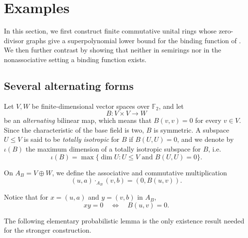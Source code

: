 \documentclass[a4paper,11pt]{amsart}
\theoremstyle{definition}
\newcommand{\F}{\mathbb F}
\begin{document}
\section{Examples}\label{sec:examples}

In this section, we first construct finite commutative unital rings whose zero-divisor graphs give a superpolynomial lower bound for the binding
function of .  We then further contrast  by showing that neither in semirings nor in the nonassociative setting a binding function exists.

\subsection{Several alternating forms}\label{subsec:many-forms}

Let $V,W$ be finite-dimensional vector spaces over $\F_2$, and let
\[
 B:V\times V\rightarrow W
\]
be an \textit{alternating} bilinear map, which means that $B(v,v)=0$ for every $v\in V$.  Since the characteristic of the base field is two, $B$ is
symmetric. A subspace $U\leq V$ is said to be \textit{totally isotropic} for $B$ if $B(U,U)=0$, and we denote by $\iota(B)$ the maximum dimension of a totally isotropic subspace for $B$, i.e. \[
 \iota(B)=\max\{\dim U:U\le V\text{ and } B(U,U)=0\}.
\]

On $A_B=V\oplus W$, we define the associative and commutative multiplication
\begin{equation}\label{eq:two-step-product}
 (u,a)\cdot_{A_B}(v,b)=(0,B(u,v)).
\end{equation}

Notice that for $x=(u,a)$ and $y=(v,b)$ in $A_B$,
\begin{equation}\label{eq:two-step-adjacency}
 xy=0\quad\Longleftrightarrow\quad B(u,v)=0.
\end{equation} 

The following elementary probabilistic lemma is the only existence result
needed for the stronger construction.
\end{document}
